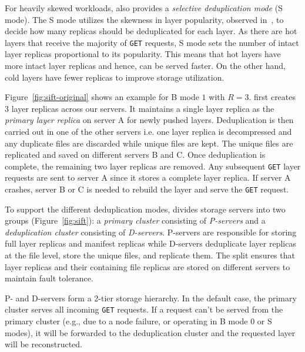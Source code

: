 For heavily skewed workloads, \sysname also provides a \emph{selective
deduplication mode} (S mode).
%
The S mode utilizes the skewness in layer popularity, observed
in~\cite{dockerworkload}, to decide how many replicas should be deduplicated
for each layer.
%
As there are hot layers that receive the majority of \texttt{GET} requests,
S mode sets the number of intact layer replicas proportional to its
popularity.
%
This means that hot layers have more intact layer replicas and
hence, can be served faster.
%
On the other hand, cold layers have fewer replicas to improve storage utilization.

Figure~\ref{fig:sift-original} shows an example for B mode $1$ with $R=3$.
\sysname first creates 3 layer replicas across our servers. It maintains a single layer replica as the \emph{primary layer replica} on
server A for newly pushed layers.
%
Deduplication is then carried out in one of the other servers i.e. one layer replica is decompressed and any duplicate
files are discarded while unique files are kept.  The unique files are replicated
and saved on different servers B and C. Once deduplication is complete, the remaining two layer replicas are removed. 
%
Any subsequent \texttt{GET} layer requests are sent to server A since it
stores a complete layer replica.
%
If server A crashes, server B or C is needed to rebuild the layer and serve the
\texttt{GET} request.

To support the different deduplication modes, \sysname divides storage servers
into two groups (Figure~\ref{fig:sift}): a \emph{primary cluster}
consisting of \emph{P-servers} and a \emph{deduplication cluster} consisting of
\emph{D-servers}.
%
P-servers are responsible for storing full layer replicas and manifest replicas
while D-servers deduplicate layer replicas at the file level, store the unique
files, and replicate them.
%
The split ensures that layer replicas and their containing file
replicas are stored on different servers to maintain fault tolerance.


P- and D-servers form a 2-tier storage hierarchy. In the default case,
the primary cluster serves all incoming \texttt{GET} requests.
%
If a request can't be served from the primary cluster (e.g., due to a
node failure, or \sysname operating in B mode 0 or S modes),
it will be forwarded to the deduplication cluster and the requested
layer will be reconstructed.
%
%





